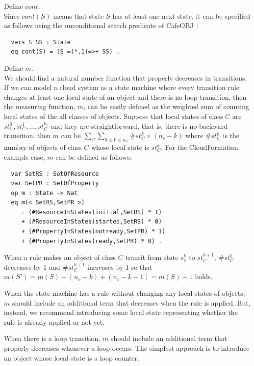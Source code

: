 \documentclass[12pt]{report}
\newcommand{\cafeobj}{{\sf CafeOBJ}~}
\begin{document}
 Define $cont$. \\ Since $cont(S)$ means that
state $S$ has at least one next state, it can be specified as follows
using the unconditional search predicate of \cafeobj:
\small
\begin{verbatim}
  vars S SS : State
  eq cont(S) = (S =(*,1)=>+ SS) .
\end{verbatim}
\normalsize
 Define $m$. \\ We should find a natural
number function that properly decreases in transitions. If we can
model a cloud system as a state machine where every transition rule
changes at least one local state of an object and there is no loop
transition, then the measuring function, $m$, can be easily defined as
the weighted sum of counting local states of the all classes of objects.
Suppose that local states of class $C$ are $st_C^0, st_C^1, \dots ,
st_C^{n_c}$ and they are straightforward, that is, there is no
backward transition, then $m$ can be $\sum_{C} \sum_{0 \le k \le n_C}
\#st_C^k \times (n_c - k)$ where $\#st_C^k$ is the number of objects
of class $C$ whose local state is $st_C^k$. For the CloudFormation
example case, $m$ can be defined as follows:
\small
\begin{verbatim}
  var SetRS : SetOfResource
  var SetPR : SetOfProperty
  op m : State -> Nat
  eq m(< SetRS,SetPR >)
     = (#ResourceInStates(initial,SetRS) * 1) 
     + (#ResourceInStates(started,SetRS) * 0)
     + (#PropertyInStates(notready,SetPR) * 1) 
     + (#PropertyInStates(ready,SetPR) * 0) .
\end{verbatim}
\normalsize
When a rule makes an object of class $C$ transit from state $s_c^k$ to
$st_C^{k+1}$, $\#st_C^k$ decreases by 1 and $\#st_C^{k+1}$ increases by 1 so that
$m(S')=m(S)-(n_c-k)+(n_c-k-1)=m(S)-1$ holds.

When the state machine has a rule without changing any local states
of objects, $m$ should include an additional term that decreases when
the rule is applied. But, instead, we recommend introducing some local
state representing whether the rule is already applied or not yet.

When there is a loop transition, $m$ should include an additional term
that properly decreases whenever a loop occurs. The simplest approach
is to introduce an object whose local state is a loop counter.\\
\end{document}

